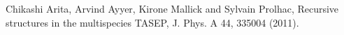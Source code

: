 \documentclass[reqno]{amsart}
\theoremstyle{plain}
\theoremstyle{definition}
\numberwithin{equation}{section}
\begin{document}

{}
\begin{thebibliography}{ABX}
 Chikashi Arita, Arvind Ayyer, Kirone Mallick and Sylvain Prolhac, Recursive structures in the multispecies TASEP, J. Phys. A 44, 335004 (2011).
\end{thebibliography}
\end{document}
